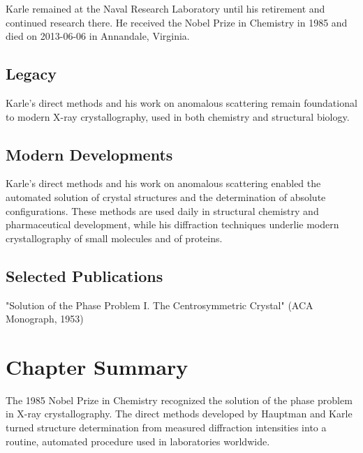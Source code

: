 Karle remained at the Naval Research Laboratory until his retirement and continued research there. He received the Nobel Prize in Chemistry in 1985 and died on 2013-06-06 in Annandale, Virginia.

\subsection*{Legacy}

Karle's direct methods and his work on anomalous scattering remain foundational to modern X-ray crystallography, used in both chemistry and structural biology.

\subsection*{Modern Developments}

Karle's direct methods and his work on anomalous scattering enabled the automated solution of crystal structures and the determination of absolute configurations. These methods are used daily in structural chemistry and pharmaceutical development, while his diffraction techniques underlie modern crystallography of small molecules and of proteins.

\subsection*{Selected Publications}

"Solution of the Phase Problem I. The Centrosymmetric Crystal" (ACA Monograph, 1953)

\clearpage

\section*{Chapter Summary}

The 1985 Nobel Prize in Chemistry recognized the solution of the phase problem in X-ray crystallography. The direct methods developed by Hauptman and Karle turned structure determination from measured diffraction intensities into a routine, automated procedure used in laboratories worldwide.
